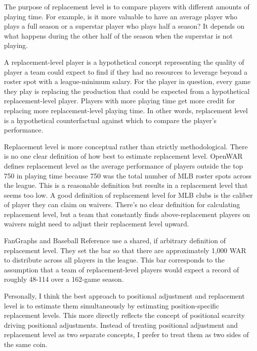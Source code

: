 \documentclass{article}
\begin{document}
        The purpose of replacement level is to compare players with different amounts of playing time. For example, is it more valuable to have an average player who plays a full season or a superstar player who plays half a season? It depends on what happens during the other half of the season when the superstar is not playing.

        A replacement-level player is a hypothetical concept representing the quality of player a team could expect to find if they had no resources to leverage beyond a roster spot with a league-minimum salary. For the player in question, every game they play is replacing the production that could be expected from a hypothetical replacement-level player. Players with more playing time get more credit for replacing more replacement-level playing time. In other words, replacement level is a hypothetical counterfactual against which to compare the player's performance.

        Replacement level is more conceptual rather than strictly methodological. There is no one clear definition of how best to estimate replacement level. OpenWAR defines replacement level as the average performance of players outside the top 750 in playing time because 750 was the total number of MLB roster spots across the league. This is a reasonable definition but results in a replacement level that seems too low. A good definition of replacement level for MLB clubs is the caliber of player they can claim on waivers. There's no clear definition for calculating replacement level, but a team that constantly finds above-replacement players on waivers might need to adjust their replacement level upward.

        FanGraphs and Baseball Reference use a shared, if arbitrary definition of replacement level. They set the bar so that there are approximately 1,000 WAR to distribute across all players in the league. This bar corresponds to the assumption that a team of replacement-level players would expect a record of roughly 48-114 over a 162-game season.

        \begin{framed}
          Personally, I think the best approach to positional adjustment and replacement level is to estimate them simultaneously by estimating position-specific replacement levels. This more directly reflects the concept of positional scarcity driving positional adjustments. Instead of treating positional adjustment and replacement level as two separate concepts, I prefer to treat them as two sides of the same coin.
        \end{framed}
\end{document}
